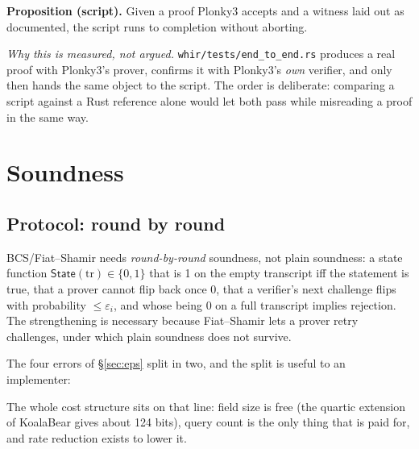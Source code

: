\documentclass[11pt,a4paper]{article}
\begin{document}
\textbf{Proposition (script).} Given a proof Plonky3 accepts and a witness laid out as documented,
the script runs to completion without aborting.

\emph{Why this is measured, not argued.} \texttt{whir/tests/end\_to\_end.rs} produces a real proof
with Plonky3's prover, confirms it with Plonky3's \emph{own} verifier, and only then hands the same
object to the script. The order is deliberate: comparing a script against a Rust reference alone
would let both pass while misreading a proof in the same way.

\section{Soundness}

\subsection*{Protocol: round by round}

BCS/Fiat--Shamir needs \emph{round-by-round} soundness, not plain soundness: a state function
$\mathsf{State}(\mathrm{tr})\in\{0,1\}$ that is 1 on the empty transcript iff the statement is true,
that a prover cannot flip back once 0, that a verifier's next challenge flips with probability
$\le\varepsilon_{i}$, and whose being 0 on a full transcript implies rejection. The strengthening is
necessary because Fiat--Shamir lets a prover retry challenges, under which plain soundness does not
survive.

The four errors of \S\ref{sec:eps} split in two, and the split is useful to an implementer:

\medskip
\noindent{}
\medskip

The whole cost structure sits on that line: field size is free (the quartic extension of KoalaBear
gives about 124 bits), query count is the only thing that is paid for, and rate reduction exists to
lower it.
\end{document}
